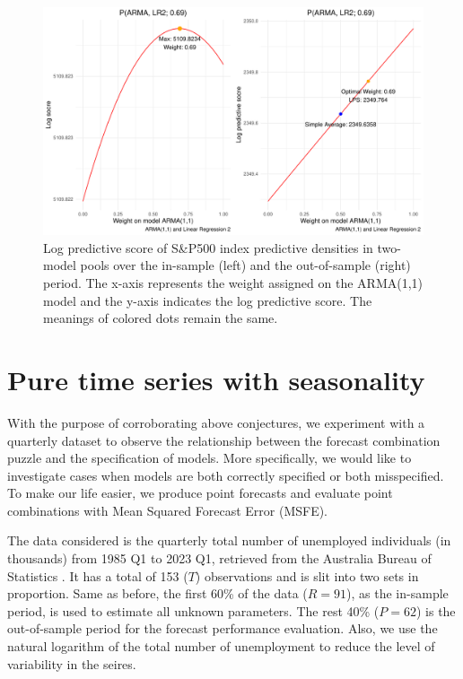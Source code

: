 \documentclass{monashthesis}
\begin{document}
\begin{figure}[ht]
\centering
\includegraphics[scale=0.6]{figures/SP500_stationary.pdf}
\caption{Log predictive score of S\&P500 index predictive densities in two-model pools over the in-sample (left) and the out-of-sample (right) period. The x-axis represents the weight assigned on the ARMA(1,1) model and the y-axis indicates the log predictive score. The meanings of colored dots remain the same.}
\label{fig:stat}
\end{figure}

\hypertarget{pure-time-series-with-seasonality}{%
\section{Pure time series with seasonality}\label{pure-time-series-with-seasonality}}

With the purpose of corroborating above conjectures, we experiment with a quarterly dataset to observe the relationship between the forecast combination puzzle and the specification of models. More specifically, we would like to investigate cases when models are both correctly specified or both misspecified. To make our life easier, we produce point forecasts and evaluate point combinations with Mean Squared Forecast Error (MSFE).

The data considered is the quarterly total number of unemployed individuals (in thousands) from 1985 Q1 to 2023 Q1, retrieved from the Australia Bureau of Statistics \autocite{ABS}. It has a total of 153 (\(T\)) observations and is slit into two sets in proportion. Same as before, the first 60\% of the data (\(R = 91\)), as the in-sample period, is used to estimate all unknown parameters. The rest 40\% (\(P = 62\)) is the out-of-sample period for the forecast performance evaluation. Also, we use the natural logarithm of the total number of unemployment to reduce the level of variability in the seires.
\end{document}
